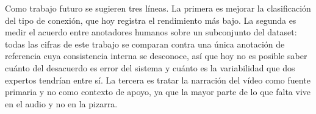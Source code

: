 \documentclass[a4paper, twocolumn, 10pt]{IEEEtran}
\begin{document}
Como trabajo futuro se sugieren tres líneas. La primera es mejorar la clasificación del tipo de conexión, que hoy registra el rendimiento más bajo. La segunda es medir el acuerdo entre anotadores humanos sobre un subconjunto del dataset: todas las cifras de este trabajo se comparan contra una única anotación de referencia cuya consistencia interna se desconoce, así que hoy no es posible saber cuánto del desacuerdo es error del sistema y cuánto es la variabilidad que dos expertos tendrían entre sí. La tercera es tratar la narración del vídeo como fuente primaria y no como contexto de apoyo, ya que la mayor parte de lo que falta vive en el audio y no en la pizarra.
 
 
 
 

 
\end{document}
